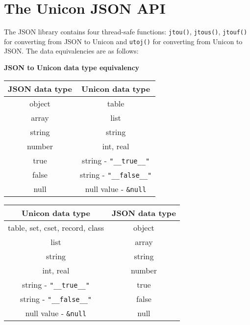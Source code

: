 \documentclass[letterpaper,12pt]{article}
\begin{document}
\section{The Unicon JSON API}

The JSON library contains four thread-safe functions: \texttt{jtou()},
\texttt{jtous()}, \texttt{jtouf()} for converting from JSON to Unicon and 
\texttt{utoj()} for converting from Unicon to JSON.
The data equivalencies are as follows: 

\begin{center}
{\large\bf JSON to Unicon data type equivalency}
\end{center}

\begin{center}
\begin{tabular}{ c | c }
 JSON data type	& Unicon data type \\
 \hline
 object		& table \\
 array		& list \\
 string		& string \\
 number		& int, real \\
 true		& string - \texttt{"\_\_true\_\_"} \\
 false		& string - \texttt{"\_\_false\_\_"} \\
 null		& null value - \texttt{\&null} \\

\end{tabular}
\end{center}

\vspace{1em}

\begin{center}
\end{center}

\begin{center}
\begin{tabular}{ c | c }
 Unicon data type			& JSON data type\\
 \hline
 table, set, cset, record, class	& object \\
 list					& array  \\
 string					& string \\
 int, real				& number \\
 string - \texttt{"\_\_true\_\_"}	& true   \\
 string - \texttt{"\_\_false\_\_"}	& false  \\
 null value - \texttt{\&null}		& null   \\

\end{tabular}
\end{center}
\end{document}
